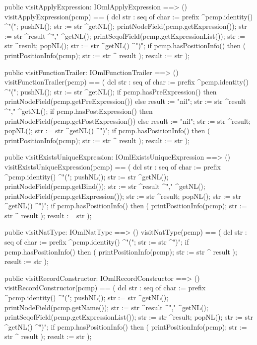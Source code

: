 \begin{vdm_al}
  public visitApplyExpression: IOmlApplyExpression ==> ()
  visitApplyExpression(pcmp) ==
    ( dcl str : seq of char := prefix ^pcmp.identity() ^"(";
      pushNL();
      str := str ^getNL();
      printNodeField(pcmp.getExpression());
      str := str ^result ^"," ^getNL();
      printSeqofField(pcmp.getExpressionList());
      str := str ^result;
      popNL();
      str := str ^getNL() ^")";
      if pcmp.hasPositionInfo()
      then ( printPositionInfo(pcmp);
             str := str ^ result );
      result := str );

  public visitFunctionTrailer: IOmlFunctionTrailer ==> ()
  visitFunctionTrailer(pcmp) ==
    ( dcl str : seq of char := prefix ^pcmp.identity() ^"(";
      pushNL();
      str := str ^getNL();
      if pcmp.hasPreExpression()
      then printNodeField(pcmp.getPreExpression())
      else result := "nil";
      str := str ^result ^"," ^getNL();
      if pcmp.hasPostExpression()
      then printNodeField(pcmp.getPostExpression())
      else result := "nil";
      str := str ^result;
      popNL();
      str := str ^getNL() ^")";
      if pcmp.hasPositionInfo()
      then ( printPositionInfo(pcmp);
             str := str ^ result );
      result := str );

  public visitExistsUniqueExpression: IOmlExistsUniqueExpression ==> ()
  visitExistsUniqueExpression(pcmp) ==
    ( dcl str : seq of char := prefix ^pcmp.identity() ^"(";
      pushNL();
      str := str ^getNL();
      printNodeField(pcmp.getBind());
      str := str ^result ^"," ^getNL();
      printNodeField(pcmp.getExpression());
      str := str ^result;
      popNL();
      str := str ^getNL() ^")";
      if pcmp.hasPositionInfo()
      then ( printPositionInfo(pcmp);
             str := str ^ result );
      result := str );

  public visitNatType: IOmlNatType ==> ()
  visitNatType(pcmp) ==
    ( dcl str : seq of char := prefix ^pcmp.identity() ^"(";
      str := str ^")";
      if pcmp.hasPositionInfo()
      then ( printPositionInfo(pcmp);
             str := str ^ result );
      result := str );

  public visitRecordConstructor: IOmlRecordConstructor ==> ()
  visitRecordConstructor(pcmp) ==
    ( dcl str : seq of char := prefix ^pcmp.identity() ^"(";
      pushNL();
      str := str ^getNL();
      printNodeField(pcmp.getName());
      str := str ^result ^"," ^getNL();
      printSeqofField(pcmp.getExpressionList());
      str := str ^result;
      popNL();
      str := str ^getNL() ^")";
      if pcmp.hasPositionInfo()
      then ( printPositionInfo(pcmp);
             str := str ^ result );
      result := str );


\end{vdm_al}
